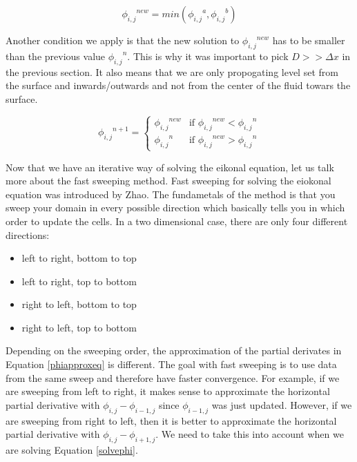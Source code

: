 \begin{equation}
{\phi_{i,j}}^{new} = min({\phi_{i,j}}^a, {\phi_{i,j}}^b)
\end{equation}

Another condition we apply is that the new solution to ${\phi_{i,j}}^{new}$ has to be smaller than the previous value ${\phi_{i,j}}^{n}$. This is why it was important to pick $D >> \Delta x$ in the previous section. It also means that we are only propogating level set from the surface and inwards/outwards and not from the center of the fluid towars the surface.

\begin{equation}
{\phi_{i,j}}^{n+1} = 
\left\{
\begin{array}{ll}
{\phi_{i,j}}^{new} & \mbox{if ${\phi_{i,j}}^{new} < {\phi_{i,j}}^{n}$} \\
{\phi_{i,j}}^{n} & \mbox{if ${\phi_{i,j}}^{new} > {\phi_{i,j}}^{n}$}
\end{array}
\right.
\end{equation}

Now that we have an iterative way of solving the eikonal equation, let us talk more about the fast sweeping method. Fast sweeping for solving the eiokonal equation was introduced by Zhao\cite{zhao}. The fundametals of the method is that you sweep your domain in every possible direction which basically tells you in which order to update the cells. In a two dimensional case, there are only four different directions:

\begin{itemize}
\item left to right, bottom to top
\item left to right, top to bottom
\item right to left, bottom to top
\item right to left, top to bottom
\end{itemize}

Depending on the sweeping order, the approximation of the partial derivates in Equation \ref{phiapproxeq} is different. The goal with fast sweeping is to use data from the same sweep and therefore have faster convergence. For example, if we are sweeping from left to right, it makes sense to approximate the horizontal partial derivative with $\phi_{i,j} - \phi_{i-1,j}$ since $\phi_{i-1,j}$ was just updated. However, if we are sweeping from right to left, then it is better to approximate the horizontal partial derivative with $\phi_{i,j} - \phi_{i+1,j}$. We need to take this into account when we are solving Equation \ref{solvephi}.

